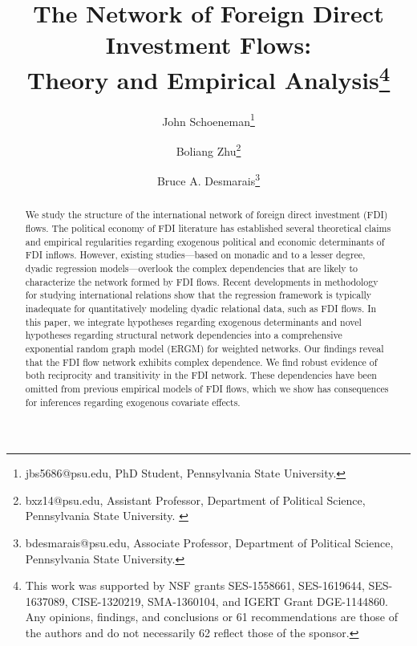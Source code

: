 \documentclass{article}
\begin{document}
\title{The Network of Foreign Direct Investment Flows: \\Theory and Empirical Analysis\footnote{This work was supported by NSF grants SES-1558661, SES-1619644, SES-1637089, CISE-1320219, SMA-1360104, and IGERT Grant DGE-1144860. Any opinions, findings, and conclusions or 61 recommendations are those of the authors and do not necessarily 62 reflect those of the sponsor.}}
\author{John  Schoeneman\thanks{\footnotesize{
jbs5686@psu.edu, PhD Student, Pennsylvania State University.}} \and Boliang Zhu\thanks{\footnotesize{bxz14@psu.edu, Assistant Professor, Department of Political Science, Pennsylvania State University. }} \and Bruce A. Desmarais\thanks{\footnotesize{
bdesmarais@psu.edu, Associate Professor, Department of Political Science, Pennsylvania State University.}}}
\date{}
\maketitle

\singlespacing
\begin{abstract}
    \noindent We study the structure of the international network of foreign direct investment (FDI) flows. The political economy of FDI literature has established several theoretical claims and empirical regularities regarding exogenous political and economic determinants of FDI inflows. %
    However, existing studies---based on monadic and to a lesser degree, dyadic regression models---overlook the complex dependencies that are likely to characterize the network formed by FDI flows. Recent developments in methodology for studying international relations show that the regression framework is typically inadequate for quantitatively modeling dyadic relational data, such as FDI flows. In this paper, we integrate hypotheses regarding exogenous determinants and novel hypotheses regarding structural network dependencies into a comprehensive exponential random graph model (ERGM) for weighted networks. Our findings reveal that the FDI flow network exhibits complex dependence. We find robust evidence of both reciprocity and transitivity in the FDI network. These dependencies have been omitted from previous empirical models of FDI flows, which we show has consequences for inferences regarding exogenous covariate effects.

\end{abstract}

\clearpage
\doublespacing
\end{document}
